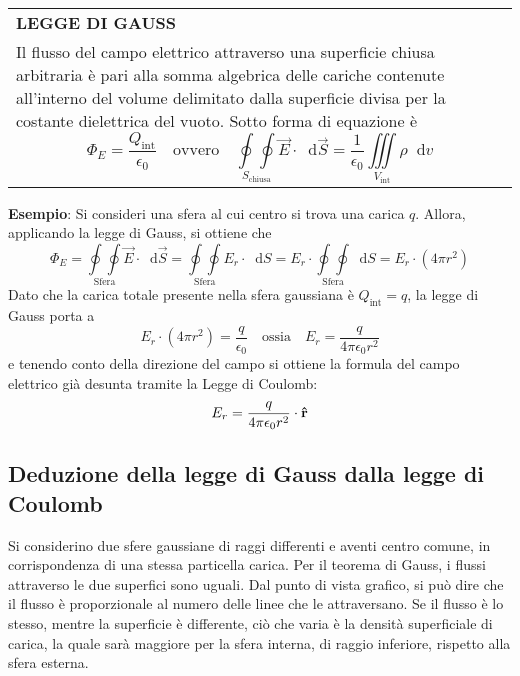 \documentclass[a4paper]{extarticle}
\renewcommand\arraystretch{}
\newcommand\dif{\mathop{}\!\mathrm{d}}
\begin{document}
\vspace{1em}
\setlength{\tabcolsep}{14pt}
\renewcommand{\arraystretch}{2}
\noindent
\begin{tabularx}{\textwidth}{@{}|P|@{}}
    \hline
    {\textbf{LEGGE DI GAUSS}}\\
    \parbox{\linewidth}{Il flusso del campo elettrico attraverso una superficie chiusa arbitraria è pari alla somma algebrica delle cariche contenute all'interno del volume delimitato dalla superficie divisa per la costante dielettrica del vuoto.\\
    Sotto forma di equazione è
    \[\boxed{\Phi_E = \dfrac{Q_{\text{int}}}{\epsilon_0} \hspace{1em} \text{ovvero} \hspace{1em} \underset{S_\text{chiusa}}{\oint \oint} \vec{E} \cdot \dif \vec{S} = \frac{1}{\epsilon_0} \underset{V_\text{int}}{\iiint} \rho \dif v}\]
    \vspace{3mm}}\\
    \hline
\end{tabularx}

\vspace{2em}
\noindent
\textbf{Esempio}: Si consideri una sfera al cui centro si trova una carica $q$. Allora, applicando la legge di Gauss, si ottiene che
\[\Phi_E = \underset{\text{Sfera}}{\oint \oint} \vec{E} \cdot \dif \vec{S} = \underset{\text{Sfera}}{\oint \oint} E_r \cdot \dif S = E_r \cdot \underset{\text{Sfera}}{\oint \oint} \dif S = E_r \cdot (4 \pi r^2)\]
Dato che la carica totale presente nella sfera gaussiana è $Q_{\text{int}} = q$, la legge di Gauss porta a
\[E_r \cdot \left(4 \pi r^2\right) = \frac{q}{\epsilon_0} \hspace{1em} \text{ossia} \hspace{1em} E_r = \frac{q}{4 \pi \epsilon_0 r^2}\]
e tenendo conto della direzione del campo si ottiene la formula del campo elettrico già desunta tramite la Legge di Coulomb:
\[E_r = \frac{q}{4 \pi \epsilon_0 r^2} \cdot \bf{\hat{r}}\]

\vspace{1em}
\subsection{Deduzione della legge di Gauss dalla legge di Coulomb}
Si considerino due sfere gaussiane di raggi differenti e aventi centro comune, in corrispondenza di una stessa particella carica. Per il teorema di Gauss, i flussi attraverso le due superfici sono uguali. Dal punto di vista grafico, si può dire che il flusso è proporzionale al numero delle linee che le attraversano. Se il flusso è lo stesso, mentre la superficie è differente, ciò che varia è la densità superficiale di carica, la quale sarà maggiore per la sfera interna, di raggio inferiore, rispetto alla sfera esterna.
\end{document}
